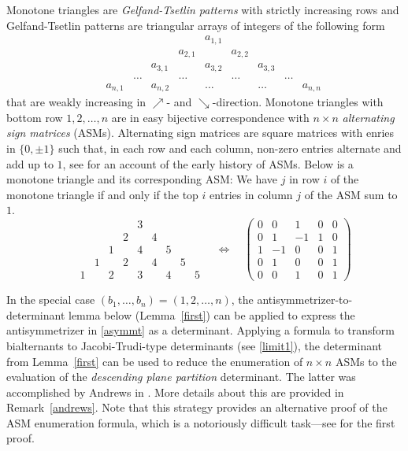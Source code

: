 \documentclass[12pt,dvipsnames]{amsart}
\theoremstyle{definition}
\begin{document}
Monotone triangles are \emph{Gelfand-Tsetlin patterns} with strictly increasing rows and Gelfand-Tsetlin patterns are 
triangular arrays of integers of the following form 
\begin{equation*}
\begin{array}{ccccccccccc}
& & & & & & a_{1,1} & & & &  \\
& & & & & a_{2,1} & & a_{2,2} & & &  \\
& & & & a_{3,1} & & a_{3,2} & & a_{3,3} & &  \\
& & & \dots & & \dots & & \dots & & \dots &  \\
& & a_{n,1} & & a_{n,2} & & \dots & & \dots & & a_{n,n} 
\end{array}
\end{equation*}
that are weakly increasing in $\nearrow$- and $\searrow$-direction.
Monotone triangles with bottom row 
$1,2,\ldots,n$ are in easy bijective correspondence with $n \times n$ \emph{alternating sign matrices} (ASMs). Alternating sign matrices 
are square matrices with enries in $\{0,\pm 1\}$ such that, in each row and each column, non-zero entries alternate and add up to $1$, see \cite{Bre00} for an account of the early history of ASMs.
Below is a monotone triangle and its corresponding ASM: We have $j$ in row $i$ of the monotone triangle if and only if the top $i$ entries in column $j$ of the ASM sum to $1$.
$$
\begin{array}{ccccccccccc}
& & & & & & 3 & & & &  \\
& & & & & 2 & & 4 & & &  \\
& & & & 1 & & 4 & & 5 & &  \\
& & & 1 & & 2 & & 4 & & 5 &  \\
& & 1 & & 2 & & 3 & & 4 & & 5 
\end{array}
\quad 
\Leftrightarrow 
\quad 
\begin{pmatrix}
0 & 0 & 1 & 0 & 0 \\
0 & 1 & -1 & 1 & 0 \\
1 & -1 & 0 & 0 & 1 \\
0 & 1 & 0 & 0 & 1 \\
0 & 0 & 1 & 0 & 1
\end{pmatrix} 
$$

In the special case $(b_1,\ldots,b_n)=(1,2,\ldots,n)$, the  
antisymmetrizer-to-determinant lemma below (Lemma~\ref{first}) can be applied to express the antisymmetrizer in \eqref{asymmt} as a determinant.  Applying a formula to transform bialternants to Jacobi-Trudi-type determinants (see \eqref{limit1}), the determinant from Lemma~\ref{first} can be used to reduce the enumeration of $n \times n$ ASMs to the evaluation of the \emph{descending plane partition} determinant. The latter was accomplished by Andrews in \cite{And79}. More details about this are provided in Remark~\ref{andrews}. Note that this strategy provides an alternative proof of the ASM enumeration formula, which is a notoriously difficult task---see \cite{Zei96} for the first proof.
\end{document}
